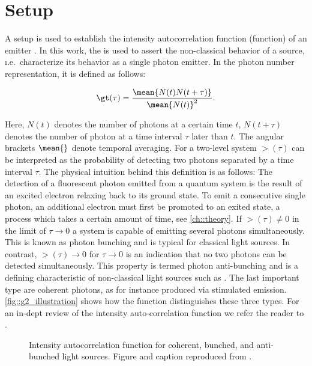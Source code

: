 	\section[HBT]{\HBT Setup}\label{sec::methods_hbt}

		A \HBT setup is used to establish the intensity autocorrelation function (\gt function) of an emitter \cite{janine::240, janine::241}.
		In this work, the \gtf is used to assert the non-classical behavior of a \pl source, \i.e.\ characterize its behavior as a single photon emitter.
		In the photon number representation, it is defined as follows:

		\begin{equation}
		\gt(\tau) = \frac{ \mean{ N(t) N(t+\tau) } }{\mean{N(t)}^2}.
		\end{equation}

		Here, $N(t)$ denotes the number of photons at a certain time $t$, $N(t+\tau)$ denotes the number of photon at a time interval $\tau$ later than $t$.
		The angular brackets $\mean{}$ denote temporal averaging.
		For a two-level system $\gt(\tau)$ can be interpreted as the probability of detecting two photons separated by a time interval $\tau$.
		The physical intuition behind this definition is as follows: The detection of a fluorescent photon emitted from a quantum system is the result of an excited electron relaxing back to its ground state. To emit a consecutive single photon, an additional electron must first be promoted to an exited state, a process which takes a certain amount of time, see \autoref{ch::theory}. If $\gt(\tau) \neq 0$ in the limit of $\tau \to 0$ a system is capable of emitting several photons simultaneously. This is known as photon bunching and is typical for classical light sources. In contrast, $\gt(\tau) \to 0$ for $\tau \to 0$ is an indication that no two photons can be detected simultaneously. This property is termed photon anti-bunching and is a defining characteristic of non-classical light sources such as \sps. The last important type are coherent photons, as for instance produced via stimulated emission. \autoref{fig::g2_illustration} shows how the \gt function distinguishes these three types. For an in-dept review of the intensity auto-correlation function we refer the reader to \cite{neu::thesis, Fox2006}.

		\begin{figure}[htb]
			\centering
			\caption[Sketch of typical \gt functions]{Intensity autocorrelation function for coherent, bunched, and anti-bunched light sources. Figure and caption reproduced from \cite{nancy::thesis}.}
			\label{fig::g2_illustration}
		\end{figure}


